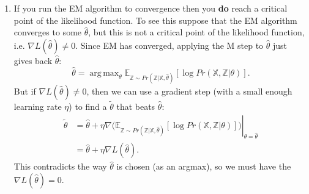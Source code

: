 \documentclass{article}
\newcommand{\X}{\mathbb{X}}
\newcommand{\Z}{\mathbb{Z}}
\DeclareMathOperator*{\argmax}{arg\,max}
\begin{document}
\begin{enumerate}
    \item If you run the EM algorithm to convergence then you \textbf{do} reach a critical point of the likelihood function. To see this suppose that the EM algorithm converges to some $\hat \theta$, but this is not a critical point of the likelihood function, i.e. $\nabla L(\hat\theta)\neq0$. Since EM has converged, applying the M step to $\hat \theta$ just gives back $\hat\theta$:
    \[
        \hat \theta = \argmax_\theta \mathbb{E}_{\Z\sim Pr(\Z|\X,\hat\theta)}[\log Pr(\X,\Z|\theta)].
    \]
    But if $\nabla L(\hat\theta)\neq0$, then we can use a gradient step (with a small enough learning rate $\eta$) to find a $\tilde\theta$ that beats $\hat \theta$:
    \begin{align*}
        \tilde\theta &= \hat\theta + \eta\nabla (\left.\mathbb{E}_{\Z\sim Pr(\Z|\X,\hat\theta)}[\log Pr(\X,\Z|\theta)])\right|_{\theta=\hat\theta}\\
        &=\hat\theta + \eta\nabla L(\hat\theta).
    \end{align*}
    This contradicts the way $\hat\theta$ is chosen (as an argmax), so we must have the $\nabla L(\hat\theta)=0$.
\end{enumerate}


\end{document}
